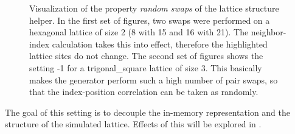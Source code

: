 \begin{figure}[htbp]
    \vspace{0.2cm}
    \caption{Visualization of the property \emph{random swaps} of the lattice structure helper. In the first set of figures, two swaps were performed on a hexagonal lattice of size 2 (8 with 15 and 16 with 21). The neighbor-index calculation takes this into effect, therefore the highlighted lattice sites do not change. The second set of figures shows the setting -1 for a trigonal\_square lattice of size 3. This basically makes the generator perform such a high number of pair swaps, so that the index-position correlation can be taken as randomly. 
    }
    \label{fig:direct-comparison-lattice-site-swaps}
\end{figure}

The goal of this setting is to decouple the in-memory representation and the structure of the simulated lattice. 
Effects of this will be explored in .